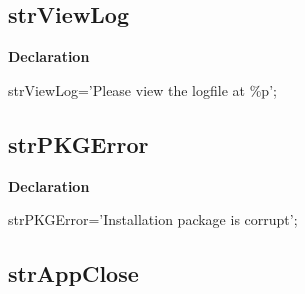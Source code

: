 \documentclass{report}
\newif\ifpdf
\begin{document}
\subsection*{strViewLog}
\fi
\label{trstrings-strViewLog}
\begin{list}{}{
\setlength{\itemindent}{0cm}
\setlength{\listparindent}{0cm}
\setlength{\leftmargin}{\evensidemargin}
\addtolength{\leftmargin}{\tmplength}
\settowidth{\labelsep}{X}
\addtolength{\leftmargin}{\labelsep}
\setlength{\labelwidth}{\tmplength}
}
\item[\textbf{Declaration}\hfill]
\ifpdf
\begin{flushleft}
\fi
\begin{ttfamily}
strViewLog='Please view the logfile at {\%}p';\end{ttfamily}

\ifpdf
\end{flushleft}
\fi

\end{list}
\ifpdf
\subsection*{\large{\textbf{strPKGError}}\normalsize\hspace{1ex}\hrulefill}
\else
\subsection*{strPKGError}
\fi
\label{trstrings-strPKGError}
\begin{list}{}{
\setlength{\itemindent}{0cm}
\setlength{\listparindent}{0cm}
\setlength{\leftmargin}{\evensidemargin}
\addtolength{\leftmargin}{\tmplength}
\settowidth{\labelsep}{X}
\addtolength{\leftmargin}{\labelsep}
\setlength{\labelwidth}{\tmplength}
}
\item[\textbf{Declaration}\hfill]
\ifpdf
\begin{flushleft}
\fi
\begin{ttfamily}
strPKGError='Installation package is corrupt';\end{ttfamily}

\ifpdf
\end{flushleft}
\fi

\end{list}
\ifpdf
\subsection*{\large{\textbf{strAppClose}}\normalsize\hspace{1ex}\hrulefill}
\else
\end{document}
